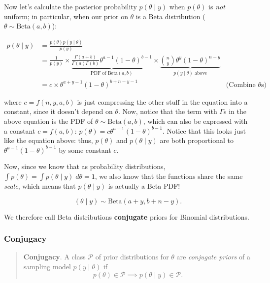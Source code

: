 \documentclass[]{article}
\begin{document}
Now let's calculate the posterior probability \(p(\theta \mid y)\) when
\(p(\theta)\) is \emph{not} uniform; in particular, when our prior on
\(\theta\) is a Beta distribution (\(\theta \sim \text{Beta}(a, b)\)):

\begin{align}
p(\theta \mid y) &= \frac{p(\theta) p(y \mid \theta)}{p(y)} & \\
&= \frac{1}{p(y)} \times \underbrace{\frac{\Gamma(a + b)}{\Gamma(a)
\Gamma(b)}\theta^{a - 1}(1 - \theta)^{b - 1}}_{\text{PDF of $\text{Beta}(a,
b)$}} \times \underbrace{{n \choose y} \theta^y (1 - \theta)^{n -
y}}_{\text{$p(y \mid \theta)$ above}} & \\
&= c \times \theta^{a + y - 1} (1 - \theta)^{b + n - y - 1} & \text{(Combine $\theta$s)} \
\end{align}

where \(c = f(n, y, a, b)\) is just compressing the other stuff in the
equation into a constant, since it doesn't depend on \(\theta\). Now,
notice that the term with \(\Gamma\)s in the above equation is the PDF
of \(\theta \sim \text{Beta}(a, b)\), which can also be expressed with a
constant \(c = f(a, b)\):
\(p(\theta) = c \theta^{a - 1}(1 - \theta)^{b - 1}\). Notice that this
looks just like the equation above: thus, \(p(\theta)\) and
\(p(\theta \mid y)\) are both proportional to
\(\theta^{a - 1} (1 - \theta)^{b - 1}\) by some constant \(c\).

Now, since we know that as probability distributions,
\(\int p(\theta) = \int p(\theta \mid y) \; d\theta = 1\), we also know
that the functions share the same \emph{scale}, which means that
\(p(\theta \mid y)\) is actually a Beta PDF!

\[
(\theta \mid y) \sim \text{Beta}(a + y, b + n - y).
\]

We therefore call Beta distributions \textbf{conjugate} priors for
Binomial distributions.

\hypertarget{conjugacy}{%
\subsubsection{Conjugacy}\label{conjugacy}}

\begin{quote}
\textbf{Conjugacy}. A class \(\mathcal{P}\) of prior distributions for
\(\theta\) are \emph{conjugate priors} of a sampling model
\(p(y \mid \theta)\) if \[ p(\theta) \in
\mathcal{P} \implies p(\theta \mid y) \in \mathcal{P}.\]
\end{quote}
\end{document}
